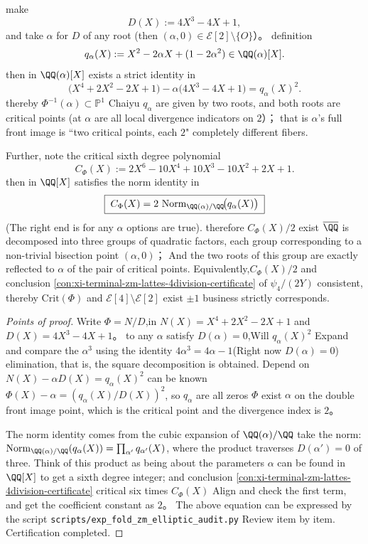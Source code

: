 \begin{conclusion}\label{con:xi-terminal-zm-lattes-critical-fiber-square-splitting}
make
\[
D(X):=4X^{3}-4X+1,
\]
and take \(\alpha\) for \(D\) of any root (then \((\alpha,0)\in\mathcal{E}[2]\setminus\{O\}\)）。
definition
\[
q_{\alpha}(X):=X^{2}-2\alpha X+(1-2\alpha^{2})\in \QQ(\alpha)[X].
\]
then in \(\QQ(\alpha)[X]\) exists a strict identity in
\[
\bigl(X^{4}+2X^{2}-2X+1\bigr)-\alpha\bigl(4X^{3}-4X+1\bigr)=q_{\alpha}(X)^{2}.
\]
thereby \(\Phi^{-1}(\alpha)\subset\mathbb{P}^{1}\) Chaiyu \(q_{\alpha}\) are given by two roots, and both roots are critical points (at \(\alpha\) are all local divergence indicators on \(2\)）；
that is \(\alpha\)’s full front image is “two critical points, each \(2\)" completely different fibers.
\par
Further, note the critical sixth degree polynomial
\[
C_{\Phi}(X):=2X^{6}-10X^{4}+10X^{3}-10X^{2}+2X+1.
\]
then in \(\QQ[X]\) satisfies the norm identity in
\[
\boxed{\;
C_{\Phi}(X)=2\,\operatorname{Norm}_{\QQ(\alpha)/\QQ}\!\bigl(q_{\alpha}(X)\bigr)\;}
\]
(The right end is for any \(\alpha\) options are true).
therefore \(C_{\Phi}(X)/2\) exist \(\overline{\QQ}\) is decomposed into three groups of quadratic factors, each group corresponding to a non-trivial bisection point \((\alpha,0)\)；
And the two roots of this group are exactly reflected to \(\alpha\) of the pair of critical points.
Equivalently,\(C_{\Phi}(X)/2\) and conclusion \ref{con:xi-terminal-zm-lattes-4division-certificate} of \(\psi_{4}/(2Y)\) consistent,
thereby \(\mathrm{Crit}(\Phi)\) and \(\mathcal{E}[4]\setminus\mathcal{E}[2]\) exist \(\pm 1\) business strictly corresponds.
\end{conclusion}
\begin{proof}[Points of proof]
Write \(\Phi=N/D\),in
\(
N(X)=X^{4}+2X^{2}-2X+1
\)
and
\(
D(X)=4X^{3}-4X+1
\)。
to any \(\alpha\) satisfy \(D(\alpha)=0\),Will \(q_{\alpha}(X)^{2}\) Expand and compare the \(\alpha^{3}\) using the identity \(4\alpha^{3}=4\alpha-1\)(Right now \(D(\alpha)=0\)) elimination, that is, the square decomposition is obtained.
Depend on \(N(X)-\alpha D(X)=q_{\alpha}(X)^{2}\) can be known \(\Phi(X)-\alpha=(q_{\alpha}(X)/D(X))^{2}\), so \(q_{\alpha}\) are all zeros \(\Phi\) exist \(\alpha\) on the double front image point, which is the critical point and the divergence index is \(2\)。
\par
The norm identity comes from the cubic expansion of \(\QQ(\alpha)/\QQ\) take the norm:
\(
\operatorname{Norm}_{\QQ(\alpha)/\QQ}(q_{\alpha}(X))=\prod_{\alpha'}q_{\alpha'}(X)
\),
where the product traverses \(D(\alpha')=0\) of three.
Think of this product as being about the parameters \(\alpha\) can be found in \(\QQ[X]\) to get a sixth degree integer;
and conclusion \ref{con:xi-terminal-zm-lattes-4division-certificate} critical six times \(C_{\Phi}(X)\) Align and check the first term, and get the coefficient constant as \(2\)。
The above equation can be expressed by the script \texttt{scripts/exp\_fold\_zm\_elliptic\_audit.py} Review item by item. Certification completed.
\end{proof}

